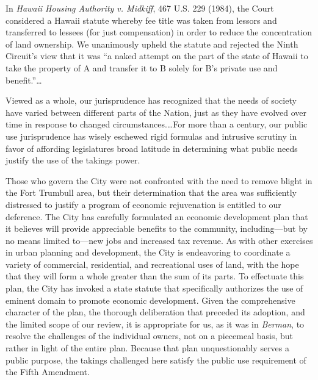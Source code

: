In \textit{Hawaii Housing Authority v. Midkiff}, 467 U.S. 229 (1984), the Court
considered a Hawaii statute whereby fee title was taken from lessors and
transferred to lessees (for just compensation) in order to reduce the
concentration of land ownership. We unanimously upheld the statute and rejected
the Ninth Circuit's view that it was ``a naked attempt on the part of the state
of Hawaii to take the property of A and transfer it to B solely for B's private
use and benefit.''\ldots

Viewed as a whole, our jurisprudence has recognized that the needs of society
have varied between different parts of the Nation, just as they have evolved
over time in response to changed circumstances.\ldots For more than a century,
our public use jurisprudence has wisely eschewed rigid formulas and intrusive
scrutiny in favor of affording legislatures broad latitude in determining what
public needs justify the use of the takings power.



Those who govern the City were not confronted with the need to remove blight in
the Fort Trumbull area, but their determination that the area was sufficiently
distressed to justify a program of economic rejuvenation is entitled to our
deference. The City has carefully formulated an economic development plan that
it believes will provide appreciable benefits to the community, including---but
by no means limited to---new jobs and increased tax revenue. As with other
exercises in urban planning and development, the City is endeavoring to
coordinate a variety of commercial, residential, and recreational uses of land,
with the hope that they will form a whole greater than the sum of its parts. To
effectuate this plan, the City has invoked a state statute that specifically
authorizes the use of eminent domain to promote economic development. Given the
comprehensive character of the plan, the thorough deliberation that preceded its
adoption, and the limited scope of our review, it is appropriate for us, as it
was in \textit{Berman}, to resolve the challenges of the individual owners, not
on a piecemeal basis, but rather in light of the entire plan. Because that plan
unquestionably serves a public purpose, the takings challenged here satisfy the
public use requirement of the Fifth Amendment.

